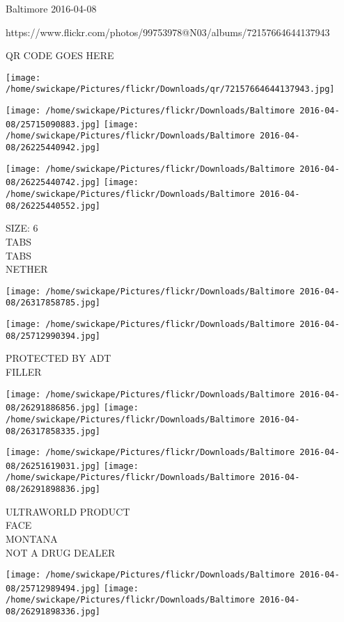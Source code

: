 \documentclass[10pt,letterpaper]{article}
\begin{document}
Baltimore 2016-04-08

https://www.flickr.com/photos/99753978@N03/albums/72157664644137943

QR CODE GOES HERE

\texttt{[image: /home/swickape/Pictures/flickr/Downloads/qr/72157664644137943.jpg]}
\pagebreak

\texttt{[image: /home/swickape/Pictures/flickr/Downloads/Baltimore 2016-04-08/25715090883.jpg]}
\texttt{[image: /home/swickape/Pictures/flickr/Downloads/Baltimore 2016-04-08/26225440942.jpg]}

\texttt{[image: /home/swickape/Pictures/flickr/Downloads/Baltimore 2016-04-08/26225440742.jpg]}
\texttt{[image: /home/swickape/Pictures/flickr/Downloads/Baltimore 2016-04-08/26225440552.jpg]}

SIZE: 6\\
TABS\\
TABS\\
NETHER\\
\pagebreak

\texttt{[image: /home/swickape/Pictures/flickr/Downloads/Baltimore 2016-04-08/26317858785.jpg]}

\vspace{0.25in}
\texttt{[image: /home/swickape/Pictures/flickr/Downloads/Baltimore 2016-04-08/25712990394.jpg]}

PROTECTED BY ADT\\
FILLER\\
\pagebreak

\texttt{[image: /home/swickape/Pictures/flickr/Downloads/Baltimore 2016-04-08/26291886856.jpg]}
\texttt{[image: /home/swickape/Pictures/flickr/Downloads/Baltimore 2016-04-08/26317858335.jpg]}

\texttt{[image: /home/swickape/Pictures/flickr/Downloads/Baltimore 2016-04-08/26251619031.jpg]}
\texttt{[image: /home/swickape/Pictures/flickr/Downloads/Baltimore 2016-04-08/26291898836.jpg]}

ULTRAWORLD PRODUCT\\
FACE\\
MONTANA\\
NOT A DRUG DEALER\\
\pagebreak

\texttt{[image: /home/swickape/Pictures/flickr/Downloads/Baltimore 2016-04-08/25712989494.jpg]}
\texttt{[image: /home/swickape/Pictures/flickr/Downloads/Baltimore 2016-04-08/26291898336.jpg]}
\end{document}
